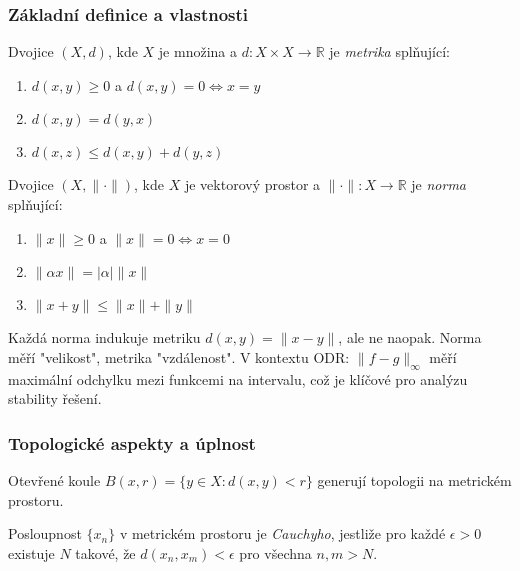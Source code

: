 \subsubsection{Základní definice a vlastnosti}

\begin{definition}
Dvojice $(X,d)$, kde $X$ je množina a $d: X \times X \to \mathbb{R}$ je \emph{metrika} splňující:
\begin{enumerate}
\item $d(x,y) \geq 0$ a $d(x,y) = 0 \Leftrightarrow x = y$
\item $d(x,y) = d(y,x)$
\item $d(x,z) \leq d(x,y) + d(y,z)$
\end{enumerate}
\end{definition}

\begin{definition}
Dvojice $(X,\|\cdot\|)$, kde $X$ je vektorový prostor a $\|\cdot\|: X \to \mathbb{R}$ je \emph{norma} splňující:
\begin{enumerate}
\item $\|x\| \geq 0$ a $\|x\| = 0 \Leftrightarrow x = 0$
\item $\|\alpha x\| = |\alpha| \|x\|$
\item $\|x + y\| \leq \|x\| + \|y\|$
\end{enumerate}
\end{definition}

\begin{intuition}
Každá norma indukuje metriku $d(x,y) = \|x - y\|$, ale ne naopak. Norma měří "velikost", metrika "vzdálenost". V kontextu ODR: $\|f-g\|_\infty$ měří maximální odchylku mezi funkcemi na intervalu, což je klíčové pro analýzu stability řešení.
\end{intuition}

\subsubsection{Topologické aspekty a úplnost}

\begin{definition}
Otevřené koule $B(x,r) = \{y \in X : d(x,y) < r\}$ generují topologii na metrickém prostoru.
\end{definition}

\begin{definition}
Posloupnost $\{x_n\}$ v metrickém prostoru je \emph{Cauchyho}, jestliže pro každé $\epsilon > 0$ existuje $N$ takové, že $d(x_n, x_m) < \epsilon$ pro všechna $n,m > N$.
\end{definition}

